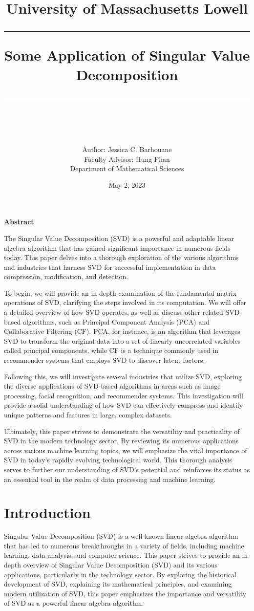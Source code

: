 \documentclass[12pt]{article}
\title{University of Massachusetts Lowell \\ [3cm]
{\vspace{-2cm}\rule{\linewidth}{0.5mm}
Some Application of Singular Value Decomposition\\
\rule{\linewidth}{0.5mm}\vspace{-0.5cm}}\\[3cm]}
\author{{Author: Jessica C. Barhouane}\\
{Faculty Advisor: Hung Phan}\\[7cm]
{Department of Mathematical Sciences}}
\date{May 2, 2023}
\begin{document}
\maketitle
\newpage

\begin{center} 
    \LARGE\textbf{Abstract\\}
\end{center}

The Singular Value Decomposition (SVD) is a powerful and adaptable linear algebra algorithm that has gained significant importance in numerous fields today. This paper delves into a thorough exploration of the various algorithms and industries that harness SVD for successful implementation in data compression, modification, and detection.

To begin, we will provide an in-depth examination of the fundamental matrix operations of SVD, clarifying the steps involved in its computation. We will offer a detailed overview of how SVD operates, as well as discuss other related SVD-based algorithms, such as Principal Component Analysis (PCA) and Collaborative Filtering (CF).  PCA, for instance, is an algorithm that leverages SVD to transform the original data into a set of linearly uncorrelated variables called principal components, while CF is a technique commonly used in recommender systems that employs SVD to discover latent factors.

Following this, we will investigate several industries that utilize SVD, exploring the diverse applications of SVD-based algorithms in areas such as image processing, facial recognition, and recommender systems. This investigation will provide a solid understanding of how SVD can effectively compress and identify unique patterns and features in large, complex datasets.

Ultimately, this paper strives to demonstrate the versatility and practicality of SVD in the modern technology sector. By reviewing its numerous applications across various machine learning topics, we will emphasize the vital importance of SVD in today's rapidly evolving technological world. This thorough analysis serves to further our understanding of SVD's potential and reinforces its status as an essential tool in the realm of data processing and machine learning.
\newpage
\tableofcontents
\newpage
\section{Introduction}
\par Singular Value Decomposition (SVD) is a well-known linear algebra algorithm that has led to numerous breakthroughs in a variety of fields, including machine learning, data analysis, and computer science. This paper strives to provide an in-depth overview of Singular Value Decomposition (SVD) and its various applications, particularly in the technology sector. By exploring the historical development of SVD, explaining its mathematical principles, and examining modern utilization of SVD, this paper emphasizes the importance and versatility of SVD as a powerful linear algebra algorithm.
\end{document}
